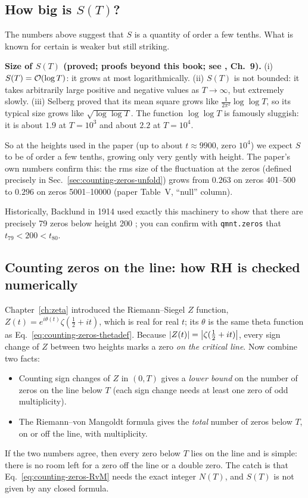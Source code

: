 \subsection{How big is $S(T)$?}

The numbers above suggest that $S$ is a quantity of order a few tenths. What is known for certain is weaker but still striking.

\begin{beyond}
\textbf{Size of $S(T)$ (proved; proofs beyond this book; see \cite{titchmarsh}, Ch.~9).} (i) $S(T)=\mathcal{O}(\log T)$: it grows at most logarithmically. (ii) $S(T)$ is not bounded: it takes arbitrarily large positive and negative values as $T\to\infty$, but extremely slowly. (iii) Selberg proved that its mean square grows like $\frac{1}{2\pi^2}\log\log T$, so its typical size grows like $\sqrt{\log\log T}$. The function $\log\log T$ is famously sluggish: it is about $1.9$ at $T=10^3$ and about $2.2$ at $T=10^4$.
\end{beyond}

So at the heights used in the paper (up to about $t\approx 9900$, zero $10^4$) we expect $S$ to be of order a few tenths, growing only very gently with height. The paper's own numbers confirm this: the rms size of the fluctuation at the zeros (defined precisely in Sec.~\ref{sec:counting-zeros-unfold}) grows from $0.263$ on zeros 401--500 to $0.296$ on zeros 5001--10000 (paper Table~V, ``null'' column).

Historically, Backlund in 1914 used exactly this machinery to show that there are precisely 79 zeros below height 200 \cite{edwards}; you can confirm with \texttt{qmnt.zeros} that $t_{79}<200<t_{80}$.

\subsection{Counting zeros on the line: how RH is checked numerically}

Chapter~\ref{ch:zeta} introduced the Riemann--Siegel $Z$ function, $Z(t)=e^{i\theta(t)}\zeta(\tfrac12+it)$, which is real for real $t$; its $\theta$ is the same theta function as Eq.~\eqref{eq:counting-zeros-thetadef}. Because $\left\lvert Z(t)\right\rvert=\left\lvert \zeta(\tfrac12+it)\right\rvert$, every sign change of $Z$ between two heights marks a zero \emph{on the critical line}. Now combine two facts:
\begin{itemize}
\item Counting sign changes of $Z$ in $(0,T)$ gives a \emph{lower bound} on the number of zeros on the line below $T$ (each sign change needs at least one zero of odd multiplicity).
\item The Riemann--von Mangoldt formula gives the \emph{total} number of zeros below $T$, on or off the line, with multiplicity.
\end{itemize}
If the two numbers agree, then every zero below $T$ lies on the line and is simple: there is no room left for a zero off the line or a double zero. The catch is that Eq.~\eqref{eq:counting-zeros-RvM} needs the exact integer $N(T)$, and $S(T)$ is not given by any closed formula.

